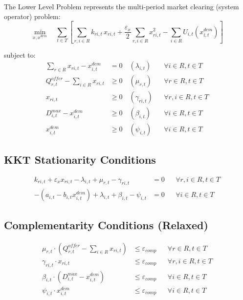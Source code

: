 The Lower Level Problem represents the multi-period market clearing (system operator) problem:
\begin{equation}
\min_{x, x^{dem}} \quad \sum_{t \in T} \left[ \sum_{r,i \in R} k_{ri,t} \, x_{ri,t} + \frac{\varepsilon_x}{2} \sum_{r,i \in R} x_{ri,t}^2 - \sum_{i \in R} U_{i,t}(x^{dem}_{i,t}) \right]
\end{equation}

\noindent subject to:
\begin{align}
\sum_{r \in R} x_{ri,t} - x^{dem}_{i,t} &= 0 \quad (\lambda_{i,t}) && \forall i \in R, t \in T \\
Q^{offer}_{r,t} - \sum_{i \in R} x_{ri,t} &\ge 0 \quad (\mu_{r,t}) && \forall r \in R, t \in T \\
x_{ri,t} &\ge 0 \quad (\gamma_{ri,t}) && \forall r, i \in R, t \in T \\
D^{max}_{i,t} - x^{dem}_{i,t} &\ge 0 \quad (\beta_{i,t}) && \forall i \in R, t \in T \\
x^{dem}_{i,t} &\ge 0 \quad (\psi_{i,t}) && \forall i \in R, t \in T
\end{align}

\subsection{KKT Stationarity Conditions}

\begin{align}
k_{ri,t} + \varepsilon_x x_{ri,t} - \lambda_{i,t} + \mu_{r,t} - \gamma_{ri,t} &= 0 && \forall r, i \in R, t \in T \\
-(a_{i,t} - b_{i,t} x^{dem}_{i,t}) + \lambda_{i,t} + \beta_{i,t} - \psi_{i,t} &= 0 && \forall i \in R, t \in T
\end{align}

\subsection{Complementarity Conditions (Relaxed)}

\begin{align}
\mu_{r,t} \cdot \left( Q^{offer}_{r,t} - \sum_{i \in R} x_{ri,t} \right) &\le \varepsilon_{comp} && \forall r \in R, t \in T \\
\gamma_{ri,t} \cdot x_{ri,t} &\le \varepsilon_{comp} && \forall r, i \in R, t \in T \\
\beta_{i,t} \cdot (D^{max}_{i,t} - x^{dem}_{i,t}) &\le \varepsilon_{comp} && \forall i \in R, t \in T \\
\psi_{i,t} \cdot x^{dem}_{i,t} &\le \varepsilon_{comp} && \forall i \in R, t \in T
\end{align}

